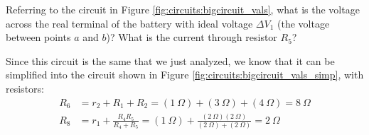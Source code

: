 \begin{example}{Referring to the circuit in Figure \ref{fig:circuits:bigcircuit_vals}, what is the voltage across the real terminal of the battery with ideal voltage $\Delta V_1$ (the voltage between points $a$ and $b$)? What is the current through resistor $R_5$?}


Since this circuit is the same that we just analyzed, we know that it can be simplified into the circuit shown in Figure \ref{fig:circuits:bigcircuit_vals_simp}, with resistors:
\begin{align*}
R_6&=r_2+R_1+R_2=(\SI{1}{\Omega})+(\SI{3}{\Omega})+(\SI{4}{\Omega})=\SI{8}{\Omega}\\
R_8&=r_1+\frac{R_4R_5}{R_4+R_5}=(\SI{1}{\Omega})+\frac{(\SI{2}{\Omega})(\SI{2}{\Omega})}{(\SI{2}{\Omega})+(\SI{2}{\Omega})}=\SI{2}{\Omega}
\end{align*}


\end{example}
